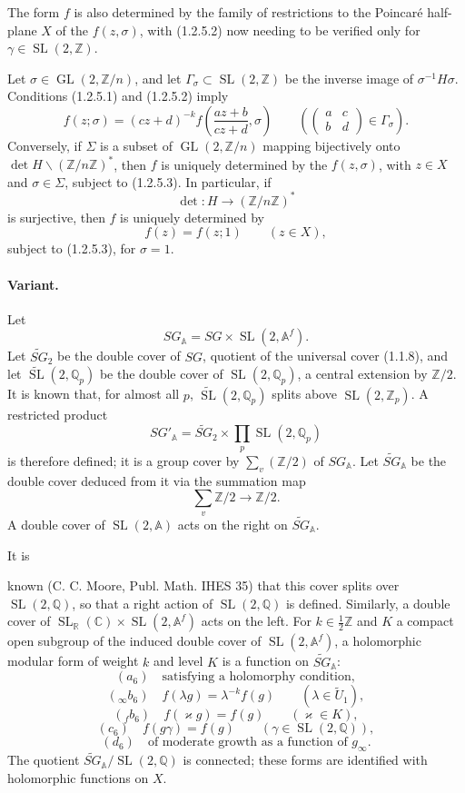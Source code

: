 \documentclass[10pt,a4paper]{article}
\providecommand{\GL}{\operatorname{GL}}
\providecommand{\SL}{\operatorname{SL}}
\providecommand{\R}{\mathbb R}
\providecommand{\Q}{\mathbb Q}
\providecommand{\Z}{\mathbb Z}
\providecommand{\C}{\mathbb C}
\providecommand{\A}{\mathbb A}
\providecommand{\Af}{\mathbb A^f}
\providecommand{\SG}{SG}
\begin{document}
The form $f$ is also determined by the family of restrictions to the Poincaré half-plane $X$ of the $f(z,\sigma)$, with (1.2.5.2) now needing to be verified only for $\gamma\in\SL(2,\Z)$.

Let $\sigma\in\GL(2,\Z/n)$, and let $\Gamma_\sigma\subset\SL(2,\Z)$ be the inverse image of $\sigma^{-1}H\sigma$. Conditions (1.2.5.1) and (1.2.5.2) imply
\[
\tag{1.2.5.3}
f(z;\sigma)=(cz+d)^{-k}f\left(\frac{az+b}{cz+d},\sigma\right)
\qquad
\left(\begin{pmatrix}a&c\\ b&d\end{pmatrix}\in\Gamma_\sigma\right).
\]
Conversely, if $\Sigma$ is a subset of $\GL(2,\Z/n)$ mapping bijectively onto $\det H\backslash(\Z/n\Z)^*$, then $f$ is uniquely determined by the $f(z,\sigma)$, with $z\in X$ and $\sigma\in\Sigma$, subject to (1.2.5.3). In particular, if
\[
\det:H\longrightarrow(\Z/n\Z)^*
\]
is surjective, then $f$ is uniquely determined by
\[
f(z)=f(z;1)\qquad(z\in X),
\]
subject to (1.2.5.3), for $\sigma=1$.

\paragraph{Variant.} Let
\[
\SG_{\A}=\SG\times\SL(2,\Af).
\]
Let $\widetilde{\SG}_2$ be the double cover of $\SG$, quotient of the universal cover (1.1.8), and let $\widetilde{\SL}(2,\Q_p)$ be the double cover of $\SL(2,\Q_p)$, a central extension by $\Z/2$. It is known that, for almost all $p$, $\widetilde{\SL}(2,\Q_p)$ splits above $\SL(2,\Z_p)$. A restricted product
\[
\SG'_{\A}=\widetilde{\SG}_2\times\prod_p\SL(2,\Q_p)
\]
is therefore defined; it is a group cover by $\sum_v(\Z/2)$ of $\SG_\A$. Let $\widetilde{\SG}_{\A}$ be the double cover deduced from it via the summation map
\[
\sum_v\Z/2\longrightarrow\Z/2.
\]
A double cover of $\SL(2,\A)$ acts on the right on $\widetilde{\SG}_\A$.

It is

\clearpage
{}
\hypertarget{authority-19}{}
known (C. C. Moore, Publ. Math. IHES 35) that this cover splits over $\SL(2,\Q)$, so that a right action of $\SL(2,\Q)$ is defined. Similarly, a double cover of $\SL_{\R}(\C)\times\SL(2,\Af)$ acts on the left. For $k\in\tfrac12\Z$ and $K$ a compact open subgroup of the induced double cover of $\SL(2,\Af)$, a holomorphic modular form of weight $k$ and level $K$ is a function on $\widetilde{\SG}_\A$:
\[
(a_6)\quad\text{satisfying a holomorphy condition},
\]
\[
({}_{\infty}b_6)\quad f(\lambda g)=\lambda^{-k}f(g)\qquad(\lambda\in\widetilde U_1),
\]
\[
({}_{f}b_6)\quad f(\varkappa g)=f(g)\qquad(\varkappa\in K),
\]
\[
(c_6)\quad f(g\gamma)=f(g)\qquad(\gamma\in\SL(2,\Q)),
\]
\[
(d_6)\quad\text{of moderate growth as a function of }g_\infty.
\]
The quotient $\widetilde{\SG}_{\A}/\SL(2,\Q)$ is connected; these forms are identified with holomorphic functions on $X$.
\end{document}
